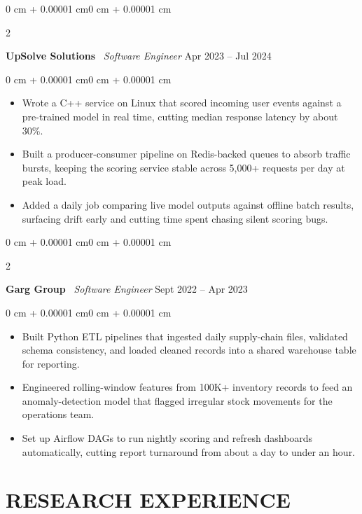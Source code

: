 \documentclass[9pt, letterpaper]{extarticle}
\newenvironment{highlights}{
    \begin{itemize}[topsep=0.0 cm,parsep=0.0 cm,partopsep=0.0 cm,partopsep=0pt,itemsep=0pt,leftmargin=8pt]
}{\end{itemize}}
\newenvironment{onecolentry}{
    \begin{adjustwidth}{0 cm + 0.00001 cm}{0 cm + 0.00001 cm}
}{\end{adjustwidth}}
\newenvironment{twocolentry}[2][]{
    \onecolentry\def\secondColumn{#2}\setcolumnwidth{\fill, 4.5 cm}\begin{paracol}{2}
}{\switchcolumn \raggedleft \secondColumn\end{paracol}\endonecolentry}
\begin{document}
    \begin{twocolentry}{Apr 2023 -- Jul 2024}
        \textbf{UpSolve Solutions} \textperiodcentered\ \textit{Software Engineer}
    \end{twocolentry}
    \vspace{0.01 cm}
    \begin{onecolentry}
        \begin{highlights}
            \item Wrote a C++ service on Linux that scored incoming user events against a pre-trained model in real time, cutting median response latency by about 30\%.
            \item Built a producer-consumer pipeline on Redis-backed queues to absorb traffic bursts, keeping the scoring service stable across 5,000+ requests per day at peak load.
            \item Added a daily job comparing live model outputs against offline batch results, surfacing drift early and cutting time spent chasing silent scoring bugs.
        \end{highlights}
    \end{onecolentry}
    \vspace{0.02 cm}

    \begin{twocolentry}{Sept 2022 -- Apr 2023}
        \textbf{Garg Group} \textperiodcentered\ \textit{Software Engineer}
    \end{twocolentry}
    \vspace{0.01 cm}
    \begin{onecolentry}
        \begin{highlights}
            \item Built Python ETL pipelines that ingested daily supply-chain files, validated schema consistency, and loaded cleaned records into a shared warehouse table for reporting.
            \item Engineered rolling-window features from 100K+ inventory records to feed an anomaly-detection model that flagged irregular stock movements for the operations team.
            \item Set up Airflow DAGs to run nightly scoring and refresh dashboards automatically, cutting report turnaround from about a day to under an hour.
        \end{highlights}
    \end{onecolentry}
    \vspace{0.02 cm}

    \section{RESEARCH EXPERIENCE}
\end{document}
